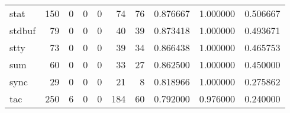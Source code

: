 \begin{longtable}{lrrrrrrrrr}
stat      &                                       150 &                                                  0 &                                                  0 &                                                  0 &                                                 74 &                                                 76 &                                           0.876667 &                               1.000000 &                             0.506667 \\
stdbuf    &                                        79 &                                                  0 &                                                  0 &                                                  0 &                                                 40 &                                                 39 &                                           0.873418 &                               1.000000 &                             0.493671 \\
stty      &                                        73 &                                                  0 &                                                  0 &                                                  0 &                                                 39 &                                                 34 &                                           0.866438 &                               1.000000 &                             0.465753 \\
sum       &                                        60 &                                                  0 &                                                  0 &                                                  0 &                                                 33 &                                                 27 &                                           0.862500 &                               1.000000 &                             0.450000 \\
sync      &                                        29 &                                                  0 &                                                  0 &                                                  0 &                                                 21 &                                                  8 &                                           0.818966 &                               1.000000 &                             0.275862 \\
tac       &                                       250 &                                                  6 &                                                  0 &                                                  0 &                                                184 &                                                 60 &                                           0.792000 &                               0.976000 &                             0.240000 \\

\end{longtable}
